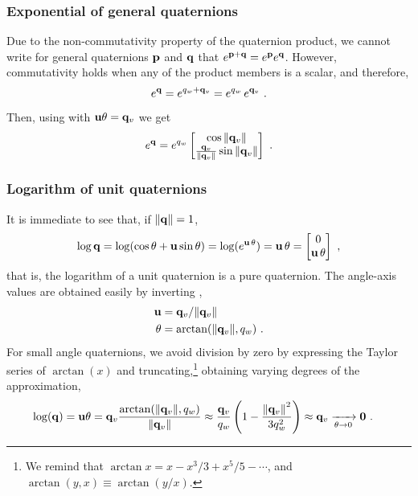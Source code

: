 \subsubsection{Exponential of general quaternions}


Due to the non-commutativity property of the quaternion product, we cannot write for general quaternions ${\bf p}$ and ${\bf q}$ that $e^{{\bf p}+{\bf q}}=e^{\bf p} e^{\bf q} $. However, commutativity holds when any of the product members is a scalar, and therefore,
%
\begin{align}
e^{\bf q} = e^{q_w+{\bf q}_v} = e^{q_w}\,e^{{\bf q}_v} ~.
\end{align}
%
Then, using  with ${\bf u}\theta={\bf q}_v$ we get
%
\begin{align}\label{equ:expGeneralQuat}
e^{\bf q} 
= e^{q_w}\begin{bmatrix}
\cos{\left\|{\bf q}_v\right\|} \\ \frac{{\bf q}_v}{{\left\|{\bf q}_v\right\|}}\sin{\left\|{\bf q}_v\right\|} 
\end{bmatrix}~.
\end{align}
%


\subsubsection{Logarithm of unit quaternions}
\label{sec:qlog}

It is immediate to see that, if ${\left\|{\bf q}\right\|}=1$,
%
\begin{align}\label{equ:qlog}
\log {\bf q} = \log (\cos \theta + {\bf u} \sin\theta) = \log(e^{{\bf u}\,\theta}) = {\bf u}\,\theta = \begin{bmatrix}
0 \\ {\bf u}\,\theta
\end{bmatrix}
~,
\end{align}
%
that is, the logarithm of a unit quaternion is a pure quaternion. The angle-axis values are obtained easily by inverting ,
%
\begin{align}
{\bf u} &= {\bf q}_v / {\left\|{\bf q}_v\right\|} \\
\theta &= \arctan({\left\|{\bf q}_v\right\|},q_w)
~.
\end{align}
%
For small angle quaternions, we avoid division by zero by expressing the Taylor series of $\arctan(x)$ and truncating,\footnote{We remind that $\arctan x = x - x^3/3 + x^5/5 - \cdots$, and $\arctan(y,x)\equiv\arctan(y/x)$.} obtaining varying degrees of the approximation,
%
\begin{align}
\log({\bf q}) 
= {\bf u}\theta 
&= {\bf q}_v\frac{\arctan({{\left\|{\bf q}_v\right\|},q_w})}{{\left\|{\bf q}_v\right\|}} 
\approx \frac{{\bf q}_v}{q_w} \left(1 - \frac{{\left\|{\bf q}_v\right\|}^2}{3q_w^2}\right)
\approx {\bf q}_v
\xrightarrow[\theta\to 0]{}
{\bf 0}
~.
\end{align}
%



